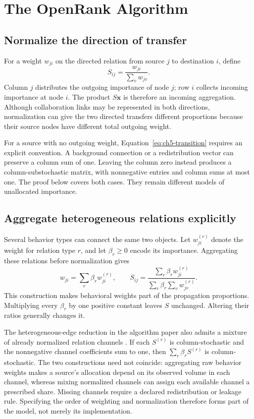 \section{The OpenRank Algorithm}
\label{sec:ch5-formulation}

\subsection{Normalize the direction of transfer}
For a weight \(w_{ji}\) on the directed relation from source \(j\) to destination \(i\), define
\begin{equation}
 S_{ij}=\frac{w_{ji}}{\sum_v w_{jv}}.
 \label{eq:ch5-transition}
\end{equation}
Column \(j\) distributes the outgoing importance of node \(j\); row \(i\) collects incoming importance at node \(i\). The product \(S\boldsymbol x\) is therefore an incoming aggregation. Although collaboration links may be represented in both directions, normalization can give the two directed transfers different proportions because their source nodes have different total outgoing weight.

For a source with no outgoing weight, Equation~\ref{eq:ch5-transition} requires an explicit convention. A background connection or a redistribution vector can preserve a column sum of one. Leaving the column zero instead produces a column-substochastic matrix, with nonnegative entries and column sums at most one. The proof below covers both cases. They remain different models of unallocated importance.

\subsection{Aggregate heterogeneous relations explicitly}
Several behavior types can connect the same two objects. Let \(w^{(r)}_{ji}\) denote the weight for relation type \(r\), and let \(\beta_r\geq0\) encode its importance. Aggregating these relations before normalization gives
\begin{equation}
 w_{ji}=\sum_r\beta_r w^{(r)}_{ji},\qquad
 S_{ij}=\frac{\sum_r\beta_r w^{(r)}_{ji}}
 {\sum_r\beta_r\sum_v w^{(r)}_{jv}}.
 \label{eq:ch5-edge-aggregation}
\end{equation}
This construction makes behavioral weights part of the propagation proportions. Multiplying every \(\beta_r\) by one positive constant leaves \(S\) unchanged. Altering their ratios generally changes it.

The heterogeneous-edge reduction in the algorithm paper also admits a mixture of already normalized relation channels \citep[Section 3.1.4]{han2026rank}. If each \(S^{(r)}\) is column-stochastic and the nonnegative channel coefficients sum to one, then \(\sum_r\beta_rS^{(r)}\) is column-stochastic. The two constructions need not coincide: aggregating raw behavior weights makes a source's allocation depend on its observed volume in each channel, whereas mixing normalized channels can assign each available channel a prescribed share. Missing channels require a declared redistribution or leakage rule. Specifying the order of weighting and normalization therefore forms part of the model, not merely its implementation.
